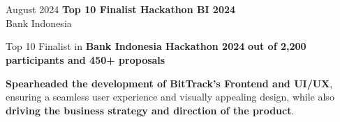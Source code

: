 \documentclass[../main.tex]{subfiles}
\begin{document}
\section{}

\begin{twocolentry}{
    August 2024
}
    \textbf{Top 10 Finalist Hackathon BI 2024}\\
    Bank Indonesia
\end{twocolentry}
\vspace{0.10 cm}
\begin{onecolentry}
\begin{highlights}
    \item Top 10 Finalist in \textbf{Bank Indonesia Hackathon 2024} \textbf{out of 2,200 participants and 450+ proposals}
    \item \textbf{Spearheaded the development of BitTrack's Frontend and UI/UX}, ensuring a seamless user experience and visually appealing design, while also \textbf{driving the business strategy and direction of the product}.
\end{highlights}
\end{onecolentry}
\end{document}
